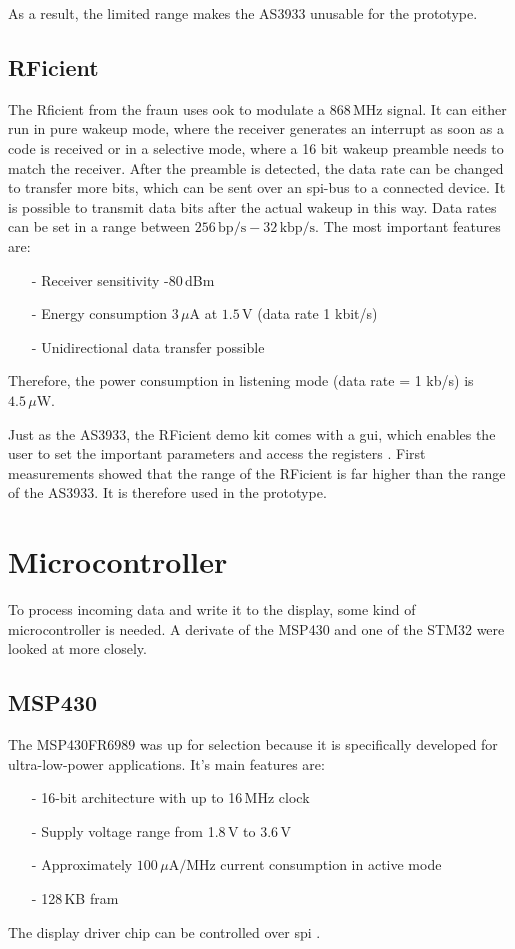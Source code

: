 As a result, the limited range makes the AS3933 unusable for the prototype. 

\subsection{RFicient}
The Rficient from the \acs{fraun} uses \acs{ook} to modulate a 868\,MHz signal.
It can either run in pure wakeup mode, where the receiver generates an interrupt as soon as a code is received or in a selective mode, where a 16 bit wakeup preamble needs to match the receiver. 
After the preamble is detected, the data rate can be changed to transfer more bits, which can be sent over an \acs{spi}-bus to a connected device.
It is possible to transmit data bits after the actual wakeup in this way.
Data rates can be set in a range between $256\,\text{bp/s}-32\,\text{kbp/s}$.
The most important features are:
\begin{itemize}
	\item[-] Receiver sensitivity -80\,dBm
	\item[-] Energy consumption $3\,\mu\text{A}$ at $1.5\,\text{V}$ (data rate 1 kbit/s)
	\item[-] Unidirectional data transfer possible	
\end{itemize}
Therefore, the power consumption in listening mode (data rate = 1 kb/s) is $4.5\,\mu\text{W}$.

Just as the AS3933, the RFicient demo kit comes with a \acs{gui}, which enables the user to set the important parameters and access the registers \cite{rficient}.
First measurements showed that the range of the RFicient is far higher than the range of the AS3933.
It is therefore used in the prototype.

\section{Microcontroller}
To process incoming data and write it to the display, some kind of microcontroller is needed.
A derivate of the MSP430 and one of the STM32 were looked at more closely.

\subsection{MSP430}
The MSP430FR6989 was up for selection because it is specifically developed for ultra-low-power applications.
It's main features are:
\begin{itemize}
	\item[-] 16-bit architecture with up to 16\,MHz clock
	\item[-] Supply voltage range from 1.8\,V to 3.6\,V
	\item[-] Approximately  $100\,\mu\text{A}/\text{MHz}$ current consumption in active mode
	\item[-] 128\,KB \acf{fram}
\end{itemize}
The display driver chip can be controlled over \acs{spi}  \cite{msp430}.

